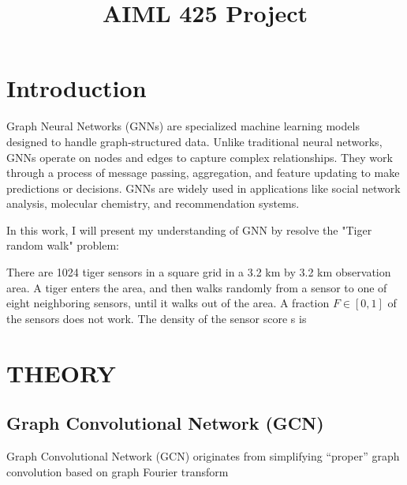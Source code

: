 \documentclass{article}
\title{AIML 425 Project}
\begin{document}
%
\maketitle
%
\section{Introduction}
\label{sec:intro}

Graph Neural Networks (GNNs) are specialized machine learning models designed to handle graph-structured data. Unlike traditional neural networks, GNNs operate on nodes and edges to capture complex relationships. They work through a process of message passing, aggregation, and feature updating to make predictions or decisions. GNNs are widely used in applications like social network analysis, molecular chemistry, and recommendation systems.

In this work, I will present my understanding of GNN by resolve the "Tiger random walk" problem:

There are 1024 tiger sensors in a square grid in a 3.2 km
by 3.2 km observation area. A tiger enters the area, and then
walks randomly from a sensor to one of eight neighboring
sensors, until it walks out of the area. A fraction $F \in [0, 1]$ of
the sensors does not work. The density of the sensor score s is




\section{THEORY}
\label{sec:theory}

\subsection{Graph Convolutional Network (GCN)}
\label{ssec:gcn}
Graph Convolutional Network (GCN) \cite{kipf2016semi} originates from simplifying “proper” graph convolution based on graph Fourier transform
\end{document}
